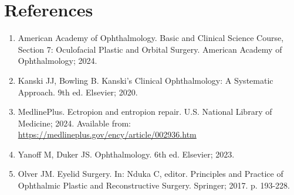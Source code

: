 \section*{References}
\begin{enumerate}
  \item American Academy of Ophthalmology. Basic and Clinical Science Course, Section 7: Oculofacial Plastic and Orbital Surgery. American Academy of Ophthalmology; 2024.

  \item Kanski JJ, Bowling B. Kanski's Clinical Ophthalmology: A Systematic Approach. 9th ed. Elsevier; 2020.

  \item MedlinePlus. Ectropion and entropion repair. U.S. National Library of Medicine; 2024. Available from: \url{https://medlineplus.gov/ency/article/002936.htm}

  \item Yanoff M, Duker JS. Ophthalmology. 6th ed. Elsevier; 2023.

  \item Olver JM. Eyelid Surgery. In: Nduka C, editor. Principles and Practice of Ophthalmic Plastic and Reconstructive Surgery. Springer; 2017. p. 193-228.
\end{enumerate}

\clearpage
